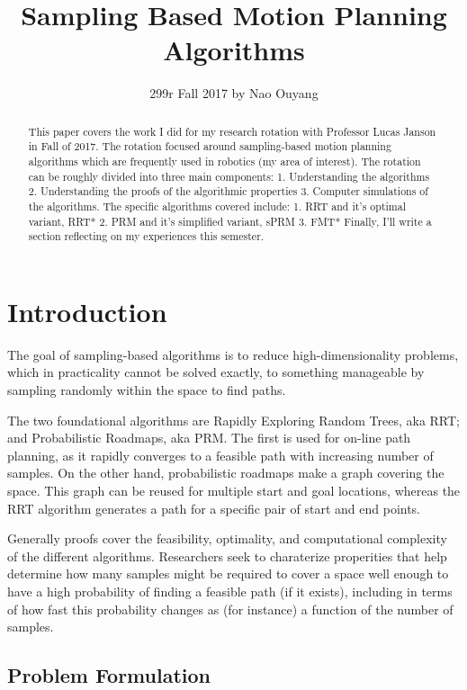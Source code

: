 \documentclass[a4paper]{article}
\title{Sampling Based Motion Planning Algorithms}
\author{299r Fall 2017 by Nao Ouyang}
\begin{document}
\maketitle

\begin{abstract} 
This paper covers the work I did for my research rotation with Professor Lucas
Janson in Fall of 2017. The rotation focused around sampling-based motion
planning algorithms which are frequently used in robotics (my area of
interest).  The rotation can be roughly divided into three main components: 1.
Understanding the algorithms 2. Understanding the proofs of the algorithmic
properties 3. Computer simulations of the algorithms. The specific algorithms
covered include: 1. RRT and it's optimal variant, RRT* 2. PRM and it's
simplified variant, sPRM 3. FMT* Finally, I'll write a section reflecting on my
experiences this semester.

\end{abstract}

\section{Introduction}

The goal of sampling-based algorithms is to reduce high-dimensionality
problems, which in practicality cannot be solved exactly, to something
manageable by sampling randomly within the space to find paths.

The two foundational algorithms are Rapidly Exploring Random Trees, aka RRT;
and Probabilistic Roadmaps, aka PRM. The first is used for on-line path
planning, as it rapidly converges to a feasible path with increasing number of
samples. On the other hand, probabilistic roadmaps make a graph covering the
space. This graph can be reused for multiple start and goal locations, whereas
the RRT algorithm generates a path for a specific pair of start and end points.

Generally proofs cover the feasibility, optimality, and computational complexity
of the different algorithms. Researchers seek to charaterize properities that
help determine how many samples might be required to cover a space well enough
to have a high probability of finding a feasible path (if it exists), including
in terms of how fast this probability changes as (for instance) a function of
the number of samples.

\subsection{Problem Formulation}
\end{document}
